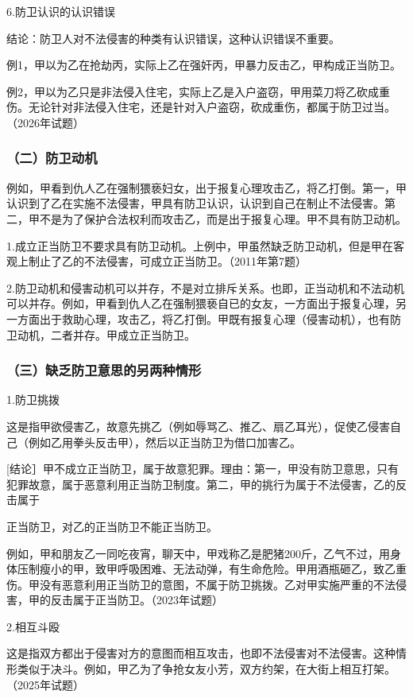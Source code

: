 6.防卫认识的认识错误

结论：防卫人对不法侵害的种类有认识错误，这种认识错误不重要。

例1，甲以为乙在抢劫丙，实际上乙在强奸丙，甲暴力反击乙，甲构成正当防卫。

例2，甲以为乙只是非法侵入住宅，实际上乙是入户盗窃，甲用菜刀将乙砍成重伤。无论针对非法侵入住宅，还是针对入户盗窃，砍成重伤，都属于防卫过当。（2026年试题）

\subsubsection*{（二）防卫动机}

例如，甲看到仇人乙在强制猥亵妇女，出于报复心理攻击乙，将乙打倒。第一，甲认识到了乙在实施不法侵害，甲具有防卫认识，认识到自己在制止不法侵害。第二，甲不是为了保护合法权利而攻击乙，而是出于报复心理。甲不具有防卫动机。

1.成立正当防卫不要求具有防卫动机。上例中，甲虽然缺乏防卫动机，但是甲在客观上制止了乙的不法侵害，可成立正当防卫。（2011年第7题）

2.防卫动机和侵害动机可以并存，不是对立排斥关系。也即，正当动机和不法动机可以并存。例如，甲看到仇人乙在强制猥亵自已的女友，一方面出于报复心理，另一方面出于救助心理，攻击乙，将乙打倒。甲既有报复心理（侵害动机），也有防卫动机，二者并存。甲成立正当防卫。

\subsubsection*{（三）缺乏防卫意思的另两种情形}

1.防卫挑拨

这是指甲欲侵害乙，故意先挑乙（例如辱骂乙、推乙、扇乙耳光），促使乙侵害自己（例如乙用拳头反击甲），然后以正当防卫为借口加害乙。

[结论］甲不成立正当防卫，属于故意犯罪。理由：第一，甲没有防卫意思，只有犯罪故意，属于恶意利用正当防卫制度。第二，甲的挑行为属于不法侵害，乙的反击属于

正当防卫，对乙的正当防卫不能正当防卫。

例如，甲和朋友乙一同吃夜宵，聊天中，甲戏称乙是肥猪200斤，乙气不过，用身体压制瘦小的甲，致甲呼吸困难、无法动弹，有生命危险。甲用酒瓶砸乙，致乙重伤。甲没有恶意利用正当防卫的意图，不属于防卫挑拨。乙对甲实施严重的不法侵害，甲的反击属于正当防卫。（2023年试题）

2.相互斗殴

这是指双方都出于侵害对方的意图而相互攻击，也即不法侵害对不法侵害。这种情形类似于决斗。例如，甲乙为了争抢女友小芳，双方约架，在大街上相互打架。（2025年试题）

